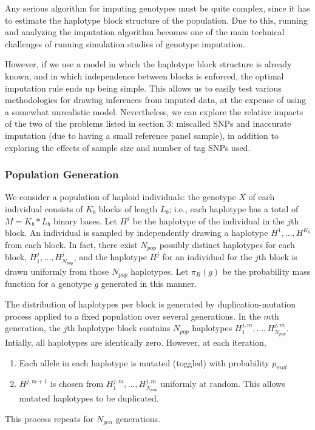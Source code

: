 \documentclass[12pt]{article}
\begin{document}
Any serious algorithm for imputing genotypes must be quite complex, 
since it has to estimate the haplotype block structure of the
population.
Due to this, running and analyzing the imputation algorithm
becomes one of the main technical challenges of running simulation
studies of genotype imputation.

However, if we use a model in which the haplotype block structure
is already known, and in which independence between blocks
is enforced, the optimal imputation rule ends up being simple.
This allows us to easily test various methodologies
for drawing inferences from imputed data,
at the expense of using a somewhat unrealistic model.
Nevertheless, we can explore the relative impacts of the two of the
problems listed in section 3: miscalled SNPs and
inaccurate imputation (due to having a small reference panel sample),
in addition to exploring the effects of sample size
and number of tag SNPs used.

\subsubsection{Population Generation}

We consider a population of haploid individuals:
the genotype $X$ of each individual consists of
$K_b$ blocks of length $L_b$;
i.e., each haplotype has a total of $M=K_b*L_b$ binary bases.
Let $H^j$ be the haplotype of the individual in the $j$th block.
An individual is sampled by independently drawing a haplotype $H^1,\hdots,H^{K_b}$from
each block.
In fact, there exist $N_{pop}$ possibly distinct haplotypes for each
block, $H^j_1,\hdots,H^j_{N_{pop}}$,
and the haplotype $H^j$ for an individual for the $j$th block
is drawn uniformly from those $N_{pop}$ haplotypes.
Let $\pi_R(g)$ be the probability mass function for a genotype $g$
generated in this manner.

The distribution of haplotypes per block is generated by
duplication-mutation process applied to a fixed population over several generations.
In the $m$th generation, the $j$th haplotype block contains $N_{pop}$
haplotypes $H^{j,m}_1,\hdots,H^{j,m}_{N_{pop}}$.
Intially, all haplotypes are identically zero.
However, at each iteration,
\begin{enumerate}
\item Each allele in each haplotype is mutated (toggled) with probability $p_{mut}$
\item $H^{j,m+1}$ is chosen from $H^{j,m}_1,\hdots,H^{j,m}_{N_{pop}}$
  uniformly at random.
This allows mutated haplotypes to be duplicated.
\end{enumerate}
This process repeats for $N_{gen}$ generations.
\end{document}
